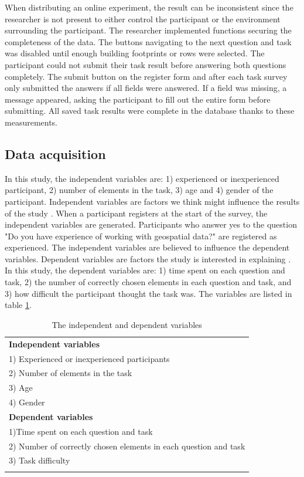 When distributing an online experiment, the result can be inconsistent since the researcher is not present to either control the participant or the environment surrounding the participant. The researcher implemented functions securing the completeness of the data. The buttons navigating to the next question and task was disabled until enough building footprints or rows were selected. The participant could not submit their task result before answering both questions completely. The submit button on the register form and after each task survey only submitted the answers if all fields were answered. If a field was missing, a message appeared, asking the participant to fill out the entire form before submitting. All saved task results were complete in the database thanks to these measurements.

\subsection{Data acquisition}
In this study, the independent variables are: 1) experienced or inexperienced participant, 2) number of elements in the task, 3) age and 4) gender of the participant.  Independent variables are factors we think might influence the results of the study \citep[p.~49]{Kitchin2000}. When a participant registers at the start of the survey, the independent variables are generated. Participants who answer yes to the question "Do you have experience of working with geospatial data?" are registered as experienced. The independent variables are believed to influence the dependent variables. Dependent variables are factors the study is interested in explaining \citep[p.~49]{Kitchin2000}. In this study, the dependent variables are: 1) time spent on each question and task, 2) the number of correctly chosen elements in each question and task, and 3) how difficult the participant thought the task was. The variables are listed in table \ref{tab:independentdependentvariables}.

\begin{longtable}{|l|}
	\hline \textbf{Independent variables}  \\
	1) Experienced or inexperienced participants   \\
	2) Number of elements in the task   \\
	3) Age   \\ 
	4) Gender  \\ \hline
	\textbf{Dependent variables}   \\ 
	1)Time spent on each question and task \\
	2) Number of correctly chosen elements in each question and task \\ 
	3) Task difficulty  \\  \hline
	\caption[Variables in the experiment]{The independent and dependent variables} \label{tab:independentdependentvariables} \\
\end{longtable}


